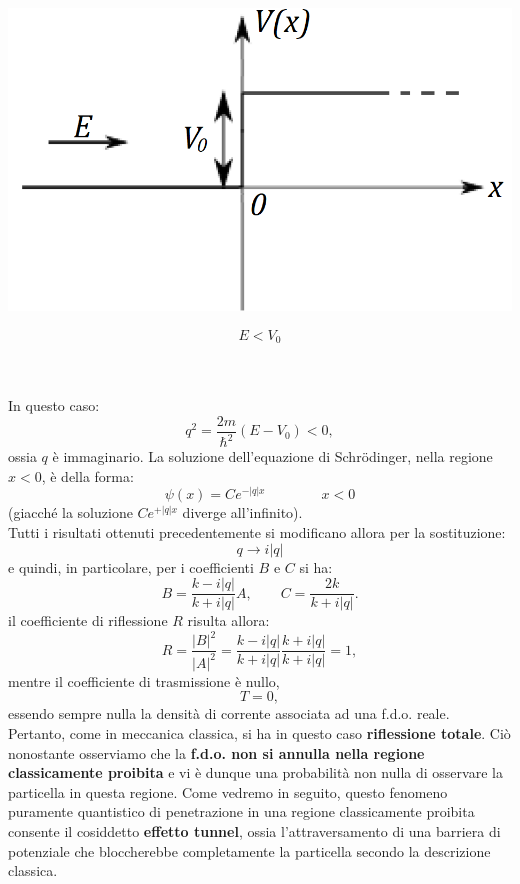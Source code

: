 \begin{minipage}{.7\textwidth}
\includegraphics[width=.9\textwidth]{immagini/cap_10/fig_10_7.png}
\end{minipage}
\hspace{.5cm}
\begin{minipage}{.1\textwidth}
\[E<V_0\]
\end{minipage}\\ \\

In questo caso:
\begin{equation}
q^2=\frac{2m}{\hbar ^2}\left( E- V_0 \right)<0,
\end{equation}
ossia $q$ è immaginario. La soluzione dell'equazione di Schr\"{o}dinger, nella regione $x<0$, è della forma:
\begin{equation}
\psi (x) = Ce^{-|q|x} \qquad \qquad x<0
\end{equation}
(giacché la soluzione $\displaystyle{Ce^{+|q|x}}$ diverge all'infinito).\\
Tutti i risultati ottenuti precedentemente si modificano allora per la sostituzione:
\begin{equation}
q \rightarrow i|q|
\end{equation}
e quindi, in particolare, per i coefficienti $B$ e $C$ si ha:
\begin{equation}
B=\frac{k-i|q|}{k+i|q|}A, \qquad C=\frac{2k}{k+i|q|}.
\end{equation}
il coefficiente di riflessione $R$ risulta allora:
\begin{equation}
R=\frac{|B|^2}{|A|^2}=\frac{k-i|q|}{k+i|q|}\frac{k+i|q|}{k+i|q|}=1,
\end{equation}
mentre il coefficiente di trasmissione è nullo,
\begin{equation}
T=0,
\end{equation}
essendo sempre nulla la densità di corrente associata ad una f.d.o. reale.\\
Pertanto, come in meccanica classica, si ha in questo caso \textbf{riflessione totale}. Ciò nonostante osserviamo che la \textbf{f.d.o. non si annulla nella regione classicamente proibita} e vi è dunque una probabilità non nulla di osservare la particella in questa regione. Come vedremo in seguito, questo fenomeno puramente quantistico di penetrazione in una regione classicamente proibita consente il cosiddetto \textbf{effetto tunnel}, ossia l'attraversamento di una barriera di potenziale che bloccherebbe completamente la particella secondo la descrizione classica.
